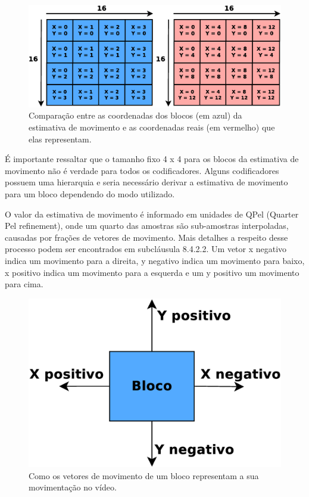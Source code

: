 \begin{figure}[H]
\centering
\includegraphics[scale=0.4]{imagens/fig16.eps}
\caption{Comparação entre as coordenadas dos blocos (em azul) da estimativa de movimento e as coordenadas reais (em vermelho) que elas representam.}
\label{fig:block_coordinate_example}
\end{figure}


É importante ressaltar que o tamanho fixo 4 x 4 para os blocos da estimativa de movimento não é verdade para todos os codificadores. Alguns codificadores possuem uma hierarquia e seria necessário derivar a estimativa de movimento para um bloco dependendo do modo utilizado.

O valor da estimativa de movimento é informado em unidades de QPel (Quarter Pel refinement), onde um quarto das amostras são sub-amostras interpoladas, causadas por frações de vetores de movimento.  Mais detalhes a respeito desse processo podem ser encontrados em \cite{ituh264avc} subcláusula 8.4.2.2. Um vetor x negativo indica um movimento para a direita, y negativo indica um movimento para baixo, x positivo indica um movimento para a esquerda e um y positivo um movimento para cima.


\begin{figure}[H]
\centering
\includegraphics[scale=0.3]{imagens/fig15.eps}
\caption{Como os vetores de movimento de um bloco representam a sua movimentação no vídeo.}
\label{fig:block_vector_example}
\end{figure}


